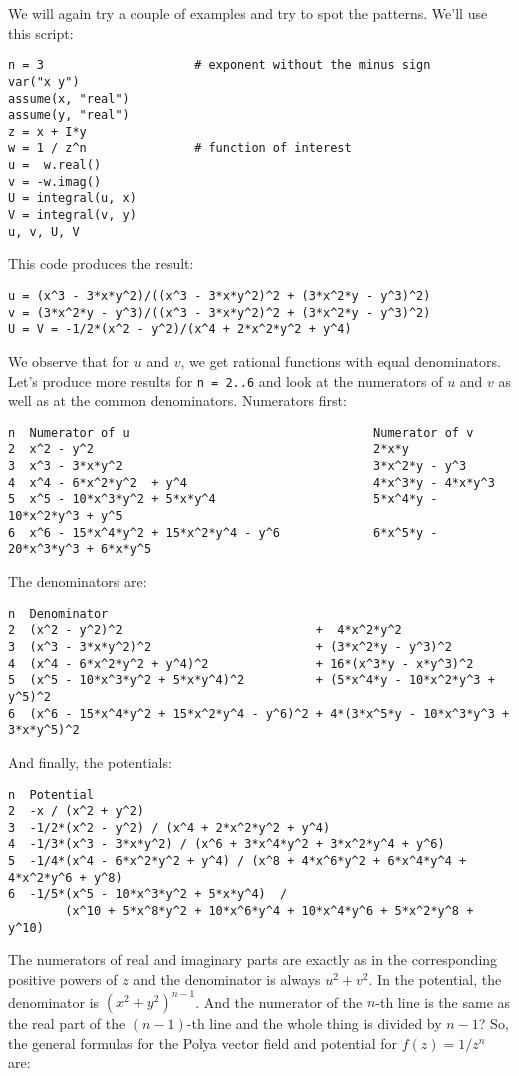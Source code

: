 \documentclass[12pt]{article}
\begin{document}
We will again try a couple of examples and try to spot the patterns. We'll use this script:
\begin{verbatim}
n = 3                     # exponent without the minus sign
var("x y")
assume(x, "real")
assume(y, "real")
z = x + I*y
w = 1 / z^n               # function of interest
u =  w.real() 
v = -w.imag()
U = integral(u, x)
V = integral(v, y)
u, v, U, V
\end{verbatim}
This code produces the result:
\begin{verbatim}
u = (x^3 - 3*x*y^2)/((x^3 - 3*x*y^2)^2 + (3*x^2*y - y^3)^2)
v = (3*x^2*y - y^3)/((x^3 - 3*x*y^2)^2 + (3*x^2*y - y^3)^2)
U = V = -1/2*(x^2 - y^2)/(x^4 + 2*x^2*y^2 + y^4)
\end{verbatim}
We observe that for $u$ and $v$, we get rational functions with equal denominators. Let's produce more results for \texttt{n = 2..6} and look at the numerators of $u$ and $v$ as well as at the common denominators. Numerators first:
\begin{verbatim}
n  Numerator of u                                  Numerator of v
2  x^2 - y^2                                       2*x*y                         
3  x^3 - 3*x*y^2                                   3*x^2*y - y^3                  
4  x^4 - 6*x^2*y^2  + y^4                          4*x^3*y - 4*x*y^3
5  x^5 - 10*x^3*y^2 + 5*x*y^4                      5*x^4*y - 10*x^2*y^3 + y^5
6  x^6 - 15*x^4*y^2 + 15*x^2*y^4 - y^6             6*x^5*y - 20*x^3*y^3 + 6*x*y^5
\end{verbatim}
The denominators are:
\begin{verbatim}
n  Denominator
2  (x^2 - y^2)^2                           +  4*x^2*y^2
3  (x^3 - 3*x*y^2)^2                       + (3*x^2*y - y^3)^2
4  (x^4 - 6*x^2*y^2 + y^4)^2               + 16*(x^3*y - x*y^3)^2
5  (x^5 - 10*x^3*y^2 + 5*x*y^4)^2          + (5*x^4*y - 10*x^2*y^3 + y^5)^2
6  (x^6 - 15*x^4*y^2 + 15*x^2*y^4 - y^6)^2 + 4*(3*x^5*y - 10*x^3*y^3 + 3*x*y^5)^2
\end{verbatim}
And finally, the potentials:
\begin{verbatim}
n  Potential
2  -x / (x^2 + y^2)
3  -1/2*(x^2 - y^2) / (x^4 + 2*x^2*y^2 + y^4)
4  -1/3*(x^3 - 3*x*y^2) / (x^6 + 3*x^4*y^2 + 3*x^2*y^4 + y^6)
5  -1/4*(x^4 - 6*x^2*y^2 + y^4) / (x^8 + 4*x^6*y^2 + 6*x^4*y^4 + 4*x^2*y^6 + y^8)
6  -1/5*(x^5 - 10*x^3*y^2 + 5*x*y^4)  / 
        (x^10 + 5*x^8*y^2 + 10*x^6*y^4 + 10*x^4*y^6 + 5*x^2*y^8 + y^10)
\end{verbatim}
The numerators of real and imaginary parts are exactly as in the corresponding positive powers of $z$ and the denominator is always $u^2 + v^2$. In the potential, the denominator is $(x^2 + y^2)^{n-1}$. And the numerator of the $n$-th line is the same as the real part of the $(n-1)$-th line and the whole thing is divided by $n-1$?  So, the general formulas for the Polya vector field and potential for $f(z) = 1/z^n$ are:
\end{document}
